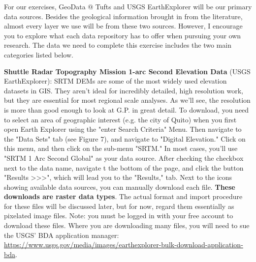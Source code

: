 \documentclass{article}
\begin{document}
For our exercises, GeoData @ Tufts and USGS EarthExplorer will be our primary data sources. Besides the geological information brought in from the literature, almost every layer we use will be from these two sources. However, I encourage you to explore what each data repository has to offer when pursuing your own research. The data we need to complete this exercise includes the two main categories listed below.

\textbf{Shuttle Radar Topography Mission 1-arc Second Elevation Data} (USGS EarthExplorer): SRTM DEMs are some of the most widely used elevation datasets in GIS. They aren't ideal for incredibly detailed, high resolution work, but they are essential for most regional scale analyses. As we'll see, the resolution is more than good enough to look at G.P. in great detail. To download, you need to select an area of geographic interest (e.g. the city of Quito) when you first open Earth Explorer using the "enter Search Criteria" Menu. Then navigate to the "Data Sets" tab (see Figure 7), and navigate to "Digital Elevation." Click on this menu, and then click on the sub-menu "SRTM." In most cases, you'll use "SRTM 1 Arc Second Global" as your data source. After checking the checkbox next to the data name, navigate t the bottom of the page, and click the button "Results >>>", which will lead you to the "Results," tab. Next to the icons showing available data sources, you can manually download each file. \textbf{These downloads are raster data types}. The actual format and import procedure for these files will be discussed later, but for now, regard them essentially as pixelated image files. Note: you must be logged in with your free account to download these files. Where you are downloading many files, you will need to sue the USGS' BDA application manager: \url{https://www.usgs.gov/media/images/earthexplorer-bulk-download-application-bda}.
\end{document}
